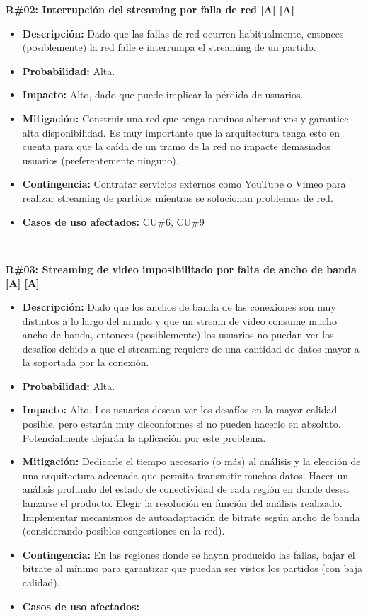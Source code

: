 \noindent\textbf{R\#02: Interrupción del streaming por falla de red [A] [A] } 
\begin{itemize}
	\item{\textbf{Descripción:} Dado que las fallas de red ocurren habitualmente, entonces (posiblemente) la red falle e interrumpa el streaming de un partido.}
	\item{\textbf{Probabilidad:} Alta.}
	\item{\textbf{Impacto:} Alto, dado que puede implicar la pérdida de usuarios.}
	\item{\textbf{Mitigación:} Construir una red que tenga caminos alternativos y garantice alta disponibilidad. Es muy importante que la arquitectura tenga esto en cuenta para que la caída de un tramo de la red no impacte demasiados usuarios (preferentemente ninguno).}
	\item{\textbf{Contingencia:} Contratar servicios externos como YouTube o Vimeo para realizar streaming de partidos mientras se solucionan problemas de red.}
	\item{\textbf{Casos de uso afectados:} CU\#6, CU\#9}
\end{itemize}

~

\noindent\textbf{R\#03: Streaming de video imposibilitado por falta de ancho de banda [A] [A]} 
\begin{itemize}
	\item{\textbf{Descripción:} Dado que los anchos de banda de las conexiones son muy distintos a lo largo del mundo y que un stream de video consume mucho ancho de banda, entonces (posiblemente) los usuarios no puedan ver los desafíos debido a que el streaming requiere de una cantidad de datos mayor a la soportada por la conexión.}
	\item{\textbf{Probabilidad:} Alta.}
	\item{\textbf{Impacto:} Alto. Los usuarios desean ver los desafíos en la mayor calidad posible, pero estarán muy disconformes si no pueden hacerlo en absoluto. Potencialmente dejarán la aplicación por este problema.}
	\item{\textbf{Mitigación:} Dedicarle el tiempo necesario (o más) al análisis y la elección  de una arquitectura adecuada que permita transmitir muchos datos. Hacer un análisis profundo del estado de conectividad de cada región en donde desea lanzarse el producto. Elegir la resolución en función del análisis realizado. Implementar mecanismos de autoadaptación de bitrate según ancho de banda (considerando posibles congestiones en la red).}
	\item{\textbf{Contingencia:} En las regiones donde se hayan producido las fallas, bajar el bitrate al mínimo para garantizar que puedan ser vistos los partidos (con baja calidad).}
	\item{\textbf{Casos de uso afectados:} }
\end{itemize}

